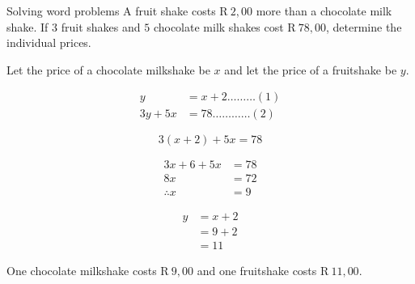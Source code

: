 \begin{wex}
{Solving word problems}
{A fruit shake costs R$~2,00$ more than a chocolate milk shake. If $3$
  fruit shakes and $5$ chocolate milk shakes cost R$~78,00$, determine
  the individual prices.}{
Let the price of a chocolate milkshake be $x$ and let the price of a fruitshake be $y$.

\begin{align*}
  y &= x+2  \ldots \ldots \ldots (1)\\
  3y+5x &= 78 \ldots \ldots \ldots \ldots (2)
\end{align*}

\begin{equation*}
  3(x+2)+5x = 78
\end{equation*}

\begin{align*}
  3x+6+5x &= 78 \\
  8x &= 72 \\
  \therefore x &= 9
\end{align*}

\begin{align*}
  y &= x+2 \\
  &= 9+2 \\
  &= 11
\end{align*}


One chocolate milkshake costs R$~9,00$ and one fruitshake costs R$~11,00$.
}
\end{wex}
\clearpage
